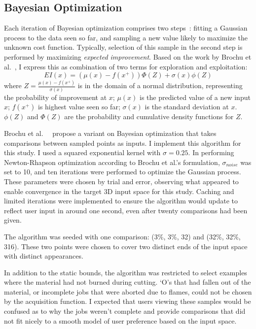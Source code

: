 \subsection{Bayesian Optimization}

Each iteration of Bayesian optimization comprises two steps~\cite{brochu_tutorial_2010}:
fitting a Gaussian process to the data seen so far, and sampling a new value likely to maximize the unknown cost function.
Typically, selection of this sample in the second step is performed by maximizing \emph{expected improvement}.
Based on the work by Brochu et al.~\cite{brochu_tutorial_2010}, I express this as combination of two terms for exploration and exploitation:
\begin{equation}
EI (x) = (\mu(x) - f (x^+)) \Phi(Z) + \sigma(x) \phi(Z)
\end{equation}
where $Z = \frac{\mu(x) - f(x^+)}{\sigma(x)}$ is in the domain of a normal distribution, representing the probability of improvement at $x$;
$\mu(x)$ is the predicted value of a new input $x$;
$f(x^+)$ is highest value seen so far;
$\sigma(x)$ is the standard deviation at $x$.
$\phi(Z)$ and $\Phi(Z)$ are the probability and cumulative density functions for $Z$.

Brochu et al.~\cite{brochu_tutorial_2010}~\cite{brochu_active_2008} propose a variant on Bayesian optimization that takes comparisons between sampled points as inputs.
I implement this algorithm for this study.
I used a squared exponential kernel with $\sigma = 0.25$.
In performing Newton-Rhapson optimization according to Brochu et al.'s formulation, $\sigma_{noise}$ was set to 10, and ten iterations were performed to optimize the Gaussian process.
These parameters were chosen by trial and error, observing what appeared to enable convergence in the target 3D input space for this study.
Caching and limited iterations were implemented to ensure the algorithm would update to reflect user input in around one second, even after twenty comparisons had been given.

The algorithm was seeded with one comparison:
(3\%, 3\%, 32) and
(32\%, 32\%, 316).
These two points were chosen to cover two distinct ends of the input space with distinct appearances.

In addition to the static bounds, the algorithm was restricted to select examples where the material had not burned during cutting.
`O's that had fallen out of the material, or incomplete jobs that were aborted due to flames, could not be chosen by the acquisition function.
I expected that users viewing these samples would be confused as to why the jobs weren't complete and provide comparisons that did not fit nicely to a smooth model of user preference based on the input space.
